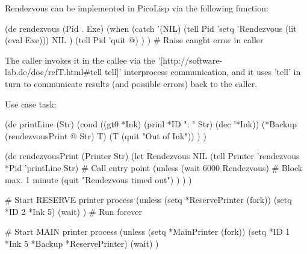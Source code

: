 \begin{wideverbatim}

Rendezvous can be implemented in PicoLisp via the following function:

(de rendezvous (Pid . Exe)
   (when
      (catch '(NIL)
         (tell Pid 'setq 'Rendezvous (lit (eval Exe)))
         NIL )
      (tell Pid 'quit @) ) )  # Raise caught error in caller

The caller invokes it in the callee via the
'[http://software-lab.de/doc/refT.html#tell tell]' interprocess communication,
and it uses 'tell' in turn to communicate results (and possible errors) back to
the caller.

Use case task:

(de printLine (Str)
   (cond
      ((gt0 *Ink) (prinl *ID ": " Str) (dec '*Ink))
      (*Backup (rendezvousPrint @ Str) T)
      (T (quit "Out of Ink")) ) )

(de rendezvousPrint (Printer Str)
   (let Rendezvous NIL
      (tell Printer 'rendezvous *Pid 'printLine Str)  # Call entry point
      (unless (wait 6000 Rendezvous)                  # Block max. 1 minute
         (quit "Rendezvous timed out") ) ) )

# Start RESERVE printer process
(unless (setq *ReservePrinter (fork))
   (setq *ID 2  *Ink 5)
   (wait) )  # Run forever

# Start MAIN printer process
(unless (setq *MainPrinter (fork))
   (setq *ID 1  *Ink 5  *Backup *ReservePrinter)
   (wait) )

\end{wideverbatim}

